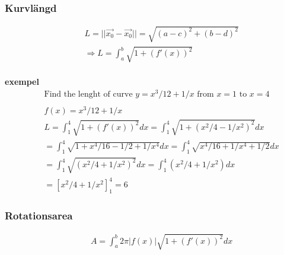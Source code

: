 \subsubsection{Kurvlängd}
\begin{align*}
  &\quad  L=||\vec{x_0} -\vec{x_0}|| = \sqrt{{(a-c)}^2 + {(b-d)}^2} \\
  &\quad  \Rightarrow L= \int_a^b \sqrt{1+{(f'(x))}^2} \\
\end{align*}

\textbf{exempel}
\begin{align*}
  &\quad  \text{Find the lenght of curve } y=x^3/12+1/x \text{ from } x=1 \text{ to } x=4  \\
  &\quad  \\
  &\quad  f(x)=x^3/12+1/x  \\
  &\quad  L = \int_1^4\sqrt{1+{(f'(x))}^2}dx = \int_1^4\sqrt{1+{(x^2/4-1/x^2)}^2}dx \\
  &\quad  = \int_1^4\sqrt{1+x^4/16-1/2+1/x^4}dx = \int_1^4\sqrt{x^4/16+1/x^4+1/2}dx \\
  &\quad  = \int_1^4\sqrt{{(x^2/4+1/x^2)}^2}dx = \int_1^4(x^2/4+1/x^2)dx \\
  &\quad  = {[x^2/4+1/x^2]}_1^4 = 6
\end{align*}

\newpage

\subsubsection{Rotationsarea}
\begin{align*}
  &\quad  A = \int_a^b 2\pi|f(x)|\sqrt{1+{(f'(x))}^2} dx \\
\end{align*}

